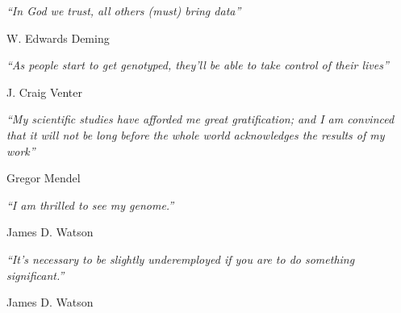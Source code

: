 \pagestyle{empty} %

\null\vfill %

\textit{``In God we trust, all others (must) bring data''}

\begin{flushright}
W. Edwards Deming
\end{flushright}

\textit{``As people start to get genotyped, they’ll be able to take control of their lives''}

\begin{flushright}
J. Craig Venter
\end{flushright}

\textit{``My scientific studies have afforded me great gratification; and I am convinced that it will not be long before the whole world acknowledges the results of my work''}

\begin{flushright}
Gregor Mendel
\end{flushright}

\textit{``I am thrilled to see my genome.''}
\begin{flushright}
James D. Watson 
\end{flushright}

\textit{``It's necessary to be slightly underemployed if you are to do something significant.''}
\begin{flushright}
James D. Watson 
\end{flushright}


\vfill\vfill\vfill\vfill\vfill\vfill\null %

\clearpage %
